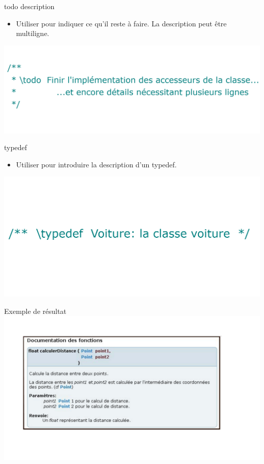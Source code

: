 \documentclass{beamer}
\begin{document}
\begin{frame}{todo {description}}
\begin{itemize}
  \item {
  Utiliser pour indiquer ce qu'il reste à faire. La description peut être multiligne.
  }
\end{itemize}

\includegraphics[scale=0.20]{Images/m5.png} 

\end{frame}

\begin{frame}{typedef  }
\begin{itemize}
  \item {
  Utiliser pour introduire la description d'un typedef.
  }
\end{itemize}

\includegraphics[scale=0.20]{Images/m6.png} 

\end{frame}

\begin{frame}{Exemple de résultat}
\includegraphics[scale=0.37]{Images/m12.png} 
\end{frame}
\end{document}
